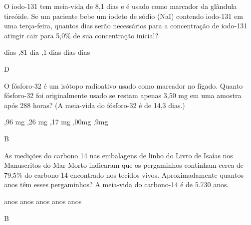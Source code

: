 \documentclass[9 pt]{scrartcl}
\begin{document}
\begin{exercise}
O iodo-131 tem meia-vida de 8,1 dias e é usado como marcador da glândula tireóide. Se um paciente bebe um iodeto de sódio (NaI) contendo iodo-131 em uma terça-feira, quantos dias serão necessários para a concentração de iodo-131 atingir cair para 5,0\% de sua concentração inicial?
\begin{choice}
 dias 
,81 dia 
,1 dias
 dias 
 dias
\end{choice}
\end{exercise}
\begin{solution}
D
\end{solution}

\begin{exercise}
O fósforo-32 é um isótopo radioativo usado como marcador no fígado. Quanto fósforo-32 foi originalmente usado se restam apenas 3,50 mg em uma amostra após 288 horas? (A meia-vida do fósforo-32 é de 14,3 dias.)
\begin{choice}
,96 mg 
,26 mg
,17 mg
,00mg
,9mg
\end{choice}
\end{exercise}
\begin{solution}
B
\end{solution}


\begin{exercise}
As medições do carbono 14 nas embalagens de linho do Livro de Isaías nos Manuscritos do Mar Morto indicaram que os pergaminhos continham cerca de 79,5\% do carbono-14 encontrado nos tecidos vivos. Aproximadamente quantos anos têm esses pergaminhos? A meia-vida do carbono-14 é de 5.730 anos.

\begin{choice}
 anos
 anos
 anos
 anos
 anos
\end{choice}
\end{exercise}
\begin{solution}
B
\end{solution}







\end{document}
